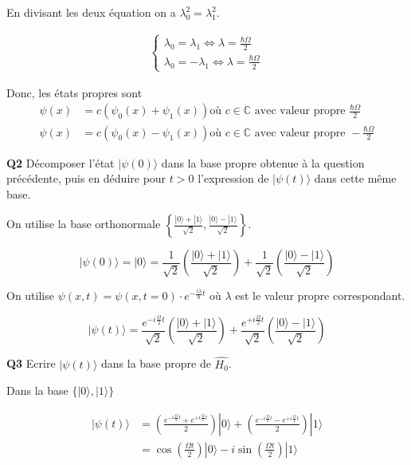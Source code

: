 \documentclass[french]{article}
\begin{document}
	En divisant les deux équation on a $\lambda_0^2 = \lambda_1^2$.
	
	\begin{align}
		\begin{cases}
		\lambda_0 = \lambda_1 \iff \lambda = \frac{\hbar \Omega}{2}\\
		\lambda_0 = -\lambda_1 \iff  \lambda = \frac{\hbar \Omega}{2}
		\end{cases}
	\end{align}
	
	Donc, les états propres sont 
	\begin{align}
		\psi(x) &= c(\psi_0(x) + \psi_1(x)) \text{où $c \in \mathbb{C}$ avec valeur propre } \frac{\hbar \Omega}{2}\\
		\psi(x) &= c(\psi_0(x) - \psi_1(x)) \text{où $c \in \mathbb{C}$ avec valeur propre } -\frac{\hbar \Omega}{2}
	\end{align}

	\begin{tcolorbox}[colback=gray!5!white,colframe=gray!75!black]
		\textbf{\large{Q2}} Décomposer l'état $|\psi(0)\rangle$ dans la base propre obtenue à la question précédente, puis en déduire pour $t > 0$ l'expression de $|\psi(t)\rangle$ dans cette même base.
	\end{tcolorbox}

	On utilise la base orthonormale $\left\{ \frac{|0\rangle + |1\rangle}{\sqrt{2}} ,\frac{|0\rangle - |1\rangle}{\sqrt{2}}  \right\}$.
	
	\[|\psi(0)\rangle = |0\rangle = \frac{1}{\sqrt{2}}\left(\frac{|0\rangle + |1\rangle}{\sqrt{2}}\right) + \frac{1}{\sqrt{2}}\left(\frac{|0\rangle - |1\rangle}{\sqrt{2}}\right) \]
	
	On utilise $\psi(x,t) = \psi(x,t=0) \cdot e^{-\frac{i\lambda}{\hbar}t}$ où $\lambda$ est le valeur propre correspondant.
	
	\[|\psi(t)\rangle = \frac{e^{-i \frac{\Omega}{2} t}}{\sqrt{2}}\left(\frac{|0\rangle + |1\rangle}{\sqrt{2}}\right) + \frac{e^{+i \frac{\Omega}{2} t}}{\sqrt{2}}\left(\frac{|0\rangle - |1\rangle}{\sqrt{2}}\right)\]

	\begin{tcolorbox}[colback=gray!5!white,colframe=gray!75!black]
		\textbf{\large{Q3}} Ecrire  $|\psi(t)\rangle$ dans la base propre de $\hat{H_0}$.
	\end{tcolorbox}

	Dans la base $\{ |0\rangle, |1\rangle\}$
	
	\begin{align}
	|\psi(t)\rangle &= \left(\frac{e^{-i \frac{\Omega}{2} t} +e^{+i \frac{\Omega}{2} t} }{2}\right) |0\rangle + \left(\frac{e^{-i \frac{\Omega}{2} t} - e^{+i \frac{\Omega}{2} t} }{2}\right) |1\rangle\\
	&= \cos\left(\frac{\Omega t}{2}\right)|0\rangle - i \sin\left(\frac{\Omega t}{2}\right)|1\rangle
	\end{align}
\end{document}
